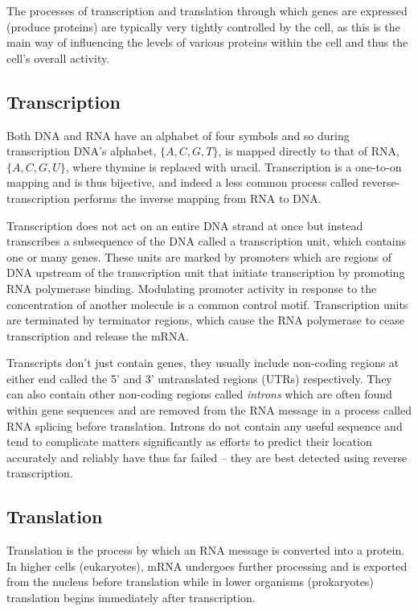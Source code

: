 The processes of transcription and translation through which genes are 
expressed (produce proteins) are typically very tightly
controlled by the cell, as this is the main way of influencing the levels of
various proteins within the cell and thus the cell's overall activity.

\subsection{Transcription}
\label{sec:transcription}

Both DNA and RNA have an alphabet of four symbols and so during transcription
DNA's alphabet, $\{A,C,G,T\}$, is mapped directly to that
of RNA, $\{A,C,G,U\}$, where thymine is replaced with uracil.
Transcription is a one-to-on mapping and is thus bijective, and indeed a less 
common process called reverse-transcription performs the inverse mapping from 
RNA to DNA.

Transcription does not act on an entire DNA strand at once but instead
transcribes a subsequence of the DNA called a transcription unit, which
contains one or many genes.
These units are marked by promoters which are regions of DNA upstream
of the transcription unit that initiate transcription by promoting 
RNA polymerase binding.
Modulating promoter activity in response to the concentration of another 
molecule is a common control motif.
Transcription units are terminated by terminator regions, which cause the RNA 
polymerase to cease transcription and release the mRNA.

Transcripts don't just contain genes, they usually include non-coding regions at 
either end called the 5' and 3' untranslated regions (UTRs) respectively.
They can also contain other non-coding regions called \textit{introns}
which are often found within gene sequences and are removed from the RNA message 
in a process called RNA splicing before translation.
Introns do not contain any useful sequence and tend to complicate matters 
significantly as efforts to predict their location accurately and reliably 
have thus far failed -- they are best detected using reverse transcription.

\subsection{Translation}
\label{sec:translation}

Translation is the process by which an RNA message is converted into a protein.
In higher cells (eukaryotes), mRNA undergoes further processing and is exported
from the nucleus before translation while in lower organisms (prokaryotes)
translation begins immediately after transcription.

